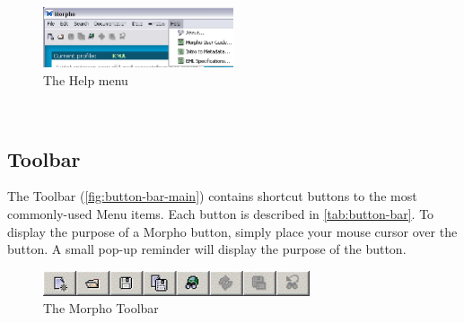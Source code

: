 \begin{figure}
  \centering
    \includegraphics[width=0.5\textwidth]{images/menu-help.jpg}
  \caption{The Help menu}
  \label{fig:menu-help}
\end{figure}
 

\subsection{Toolbar} \label{sec:toolbar}

The Toolbar (\autoref{fig:button-bar-main}) contains shortcut buttons to the
most commonly-used Menu items. Each button is described in
\autoref{tab:button-bar}. To display the purpose of a Morpho button,
simply place your mouse cursor over the button. A small pop-up reminder
will display the purpose of the button.

\begin{figure}
  \centering
    \includegraphics[width=0.7\textwidth]{images/button-bar-main.png}
  \caption{The Morpho Toolbar}
  \label{fig:button-bar-main}
\end{figure}
 
